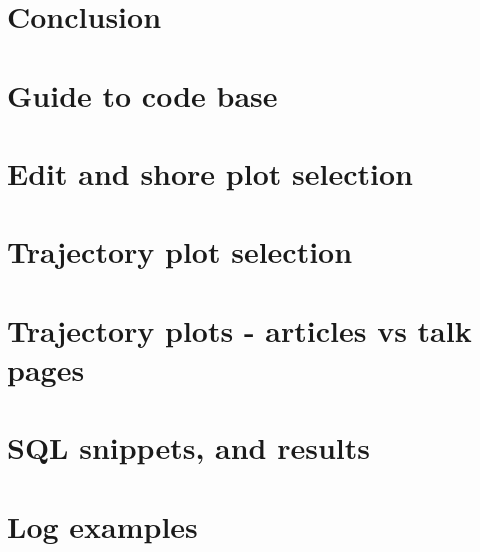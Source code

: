 \documentclass[a4paper,11pt,twoside]{report}
\begin{document}
\chapter{Conclusion}
\label{ch:conclusions}





{}
\printbibliography    

\appendix

\begin{appendices}
\chapter{Guide to code base}
\label{sec:dirtree}

\chapter{Edit and shore plot selection}
\label{sec:edit-share}

\chapter{Trajectory plot selection}

\label{sec:traj-article-talk}
\chapter{Trajectory plots - articles vs talk pages}

\chapter{SQL snippets, and results}
\label{sec:sql-things}

\chapter{Log examples}
\label{sec:appendix-debug}

\end{appendices}
 
\end{document}
